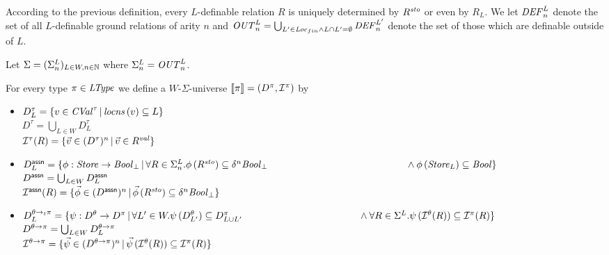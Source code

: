 \documentclass[12pt,a4paper]{report}
\begin{document}
According to the previous definition, every $L$-definable relation $R$ is uniquely determined by
$R^{\mathit{sto}}$ or even by $R_L$. We let $\mathit{DEF}^L_n$ denote the set of all $L$-definable ground relations
of arity $n$ and $\mathit{OUT}^L_n = \bigcup_{L'\in\mathit{Loc}_{fin}\wedge L \cap L' = \emptyset} \mathit{DEF}^{L'}_n$ denote
the set of those which are definable outside of $L$.

Let $\Sigma = (\Sigma^L_n)_{L\in W,n\in \mathbb N}$ where $\Sigma^L_n = \mathit{OUT}^L_n$.

\begin{definition}
  For every type $\pi\in\mathit{LType}$ we define a $W$-$\Sigma$-universe $\llbracket\pi\rrbracket=(D^\pi,\mathcal{I}^\pi)$ by
  \begin{itemize}
    \item $D^\tau_L = \{v\in\mathit{CVal}^\tau\,|\,\mathit{locns}\,(v)\subseteq L\}$ \\
          $D^\tau = \bigcup_{L\in W} D^\tau_L$ \\
          $\mathcal{I}^\tau(R) = \{\vec{v}\in(D^\tau)^n\,|\,\vec{v}\in R^{\mathit{val}}\}$

    \item $D^\tassn_L = \{ \phi:\Store\to\Bool_\bot\,|\,
                              \forall R\in\Sigma^L_n.\phi\,(R^\sto) \subseteq \delta^n\Bool_\bot \\
                              \hspace*{5cm} \wedge \phi\,(\Store_L) \subseteq \Bool
                         \}$ \\
          $D^{\mathsf{assn}} = \bigcup_{L\in W} D^{\mathsf{assn}}_L$ \\
          $\mathcal{I}^{\mathsf{assn}}(R) = \{ \vec{\phi} \in (D^{\mathsf{assn}})^n\,|\,
                                  \vec{\phi}\,(R^{\mathit{sto}}) \subseteq \delta^n \mathit{Bool}_\bot \}$

    \item $D^{\ttarrow{\theta}{\pi}}_L = \{ \psi:D^\theta \to D^\pi\,|\,
                              \forall L'\in W. \psi\,(D^\theta_{L'}) \subseteq D^\pi_{L \cup L'} \\
                              \hspace*{4.2cm} \wedge \forall R\in\Sigma^L. \psi\,(\I^\theta(R))\subseteq\I^\pi(R)\}$ \\
          $D^{\theta\to\pi} = \bigcup_{L\in W} D^{\theta\to\pi}_L$ \\
          $\mathcal{I}^{\theta\to\pi} = \{ \vec{\psi} \in (D^{\theta\to\pi})^n\,|\,
                                          \vec{\psi}\,(\mathcal{I}^\theta(R)) \subseteq \mathcal{I}^\pi(R) \}$
  \end{itemize}
\end{definition}
\end{document}
